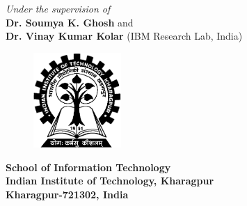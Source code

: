 \begin{center}
\vspace*{4mm}\fontsize{14pt}{16.8pt}\selectfont\textit{Under the supervision of} \\
\vspace*{2mm}\fontsize{14pt}{16.8pt}\selectfont\textbf{Dr. Soumya K. Ghosh}  and \\ \textbf{Dr. Vinay Kumar Kolar} (IBM Research Lab, India) \\
\vspace*{8mm}
\begin{figure}[!ht]
\centering
\includegraphics[height=36.068mm,width=33.274mm]{figs/iitlogo.eps}
\end{figure}
\vspace*{3mm}
\fontsize{14pt}{16.8pt}\selectfont\textbf{School of Information Technology \\
\vspace*{2mm} Indian Institute of Technology, Kharagpur} \\
\vspace*{2mm}
\fontsize{14pt}{16.8pt}\selectfont\textbf{Kharagpur-721302, India}
\end{center}
